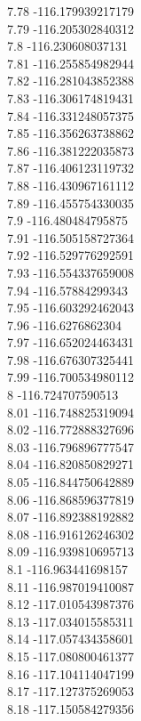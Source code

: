 {7.78	-116.179939217179\\
7.79	-116.205302840312\\
7.8	-116.230608037131\\
7.81	-116.255854982944\\
7.82	-116.281043852388\\
7.83	-116.306174819431\\
7.84	-116.331248057375\\
7.85	-116.356263738862\\
7.86	-116.381222035873\\
7.87	-116.406123119732\\
7.88	-116.430967161112\\
7.89	-116.455754330035\\
7.9	-116.480484795875\\
7.91	-116.505158727364\\
7.92	-116.529776292591\\
7.93	-116.554337659008\\
7.94	-116.57884299343\\
7.95	-116.603292462043\\
7.96	-116.6276862304\\
7.97	-116.652024463431\\
7.98	-116.676307325441\\
7.99	-116.700534980112\\
8	-116.724707590513\\
8.01	-116.748825319094\\
8.02	-116.772888327696\\
8.03	-116.796896777547\\
8.04	-116.820850829271\\
8.05	-116.844750642889\\
8.06	-116.868596377819\\
8.07	-116.892388192882\\
8.08	-116.916126246302\\
8.09	-116.939810695713\\
8.1	-116.963441698157\\
8.11	-116.987019410087\\
8.12	-117.010543987376\\
8.13	-117.034015585311\\
8.14	-117.057434358601\\
8.15	-117.080800461377\\
8.16	-117.104114047199\\
8.17	-117.127375269053\\
8.18	-117.150584279356\\
}
